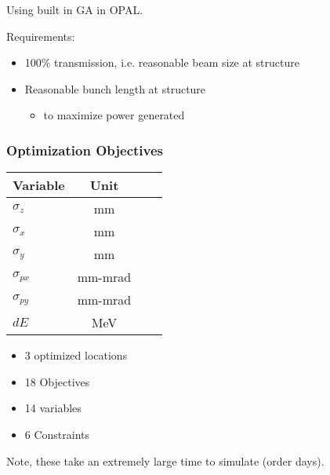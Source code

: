 \documentclass[professionalfonts,t]{beamer}
\begin{document}
\begin{frame}
{\begin{center}
\end{center}

}
\vspace{-1em}

Using built in GA in OPAL.

\vspace{0.5em}
Requirements:
\begin{itemize}
	\item 100\% transmission, i.e. reasonable beam size at structure
	\item Reasonable bunch length at structure
	\begin{itemize}
		\item to maximize power generated
	\end{itemize}
\end{itemize}

\end{frame}


\begin{frame}
\frametitle{Optimization Objectives}
\vspace{1em}
\begin{minipage}{0.45\textwidth}
	\begin{table}[hbt] 
		\centering
		\begin{tabular}{ l *{3}{c}}
			\toprule
			\textbf{Variable} &  \textbf{Unit} \\
			\midrule
			$\sigma_z$ 		& mm \\
			$\sigma_{x}$ 	& mm \\
			$\sigma_y$ 		& mm \\
			$\sigma_{px}$ 	& mm-mrad \\
			$\sigma_{py}$ 	& mm-mrad \\
			$dE$			& MeV\\
			\bottomrule	
		\end{tabular}	
	\end{table}
\end{minipage}
\begin{minipage}{0.45\textwidth}
	\begin{itemize}
		\item 3 optimized locations 
		\item 18 Objectives
		\item 14 variables 
		\item 6 Constraints
	\end{itemize}
\end{minipage}
\centering
Note, these take an extremely large time to simulate (order days).
\end{frame}
\end{document}
